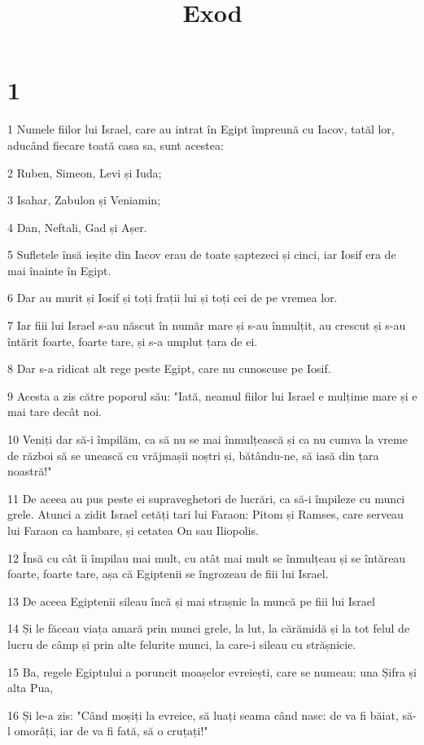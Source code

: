 

\title{Exod}


\chapter{1}

\par 1 Numele fiilor lui Israel, care au intrat în Egipt împreună cu Iacov, tatăl lor, aducând fiecare toată casa sa, sunt acestea:
\par 2 Ruben, Simeon, Levi și Iuda;
\par 3 Isahar, Zabulon și Veniamin;
\par 4 Dan, Neftali, Gad și Așer.
\par 5 Sufletele însă ieșite din Iacov erau de toate șaptezeci și cinci, iar Iosif era de mai înainte în Egipt.
\par 6 Dar au murit și Iosif și toți frații lui și toți cei de pe vremea lor.
\par 7 Iar fiii lui Israel s-au născut în număr mare și s-au înmulțit, au crescut și s-au întărit foarte, foarte tare, și s-a umplut țara de ei.
\par 8 Dar s-a ridicat alt rege peste Egipt, care nu cunoscuse pe Iosif.
\par 9 Acesta a zis către poporul său: "Iată, neamul fiilor lui Israel e mulțime mare și e mai tare decât noi.
\par 10 Veniți dar să-i împilăm, ca să nu se mai înmulțească și ca nu cumva la vreme de război să se unească cu vrăjmașii noștri și, bătându-ne, să iasă din țara noastră!"
\par 11 De aceea au pus peste ei supraveghetori de lucrări, ca să-i împileze cu munci grele. Atunci a zidit Israel cetăți tari lui Faraon: Pitom și Ramses, care serveau lui Faraon ca hambare, și cetatea On sau Iliopolis.
\par 12 Însă cu cât îi împilau mai mult, cu atât mai mult se înmulțeau și se întăreau foarte, foarte tare, așa că Egiptenii se îngrozeau de fiii lui Israel.
\par 13 De aceea Egiptenii sileau încă și mai strașnic la muncă pe fiii lui Israel
\par 14 Și le făceau viața amară prin munci grele, la lut, la cărămidă și la tot felul de lucru de câmp și prin alte felurite munci, la care-i sileau cu strășnicie.
\par 15 Ba, regele Egiptului a poruncit moașelor evreiești, care se numeau: una Șifra și alta Pua,
\par 16 Și le-a zis: "Când moșiți la evreice, să luați seama când nasc: de va fi băiat, să-l omorâți, iar de va fi fată, să o cruțați!"

